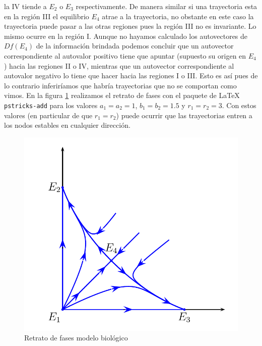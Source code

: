 la IV tiende a $E_2$ o $E_3$ respectivamente. De manera similar si
una trayectoria esta en la región III el equilibrio $E_4$ atrae a
la trayectoria, no obstante en este caso la trayectoria puede
pasar a las otras regiones pues la región III no es invariante. Lo
mismo ocurre en la región I. Aunque no hayamos calculado los
autovectores de $Df(E_4)$ de la información brindada podemos
concluir que un autovector correspondiente al autovalor positivo
tiene que apuntar (supuesto su origen en $E_4$) hacia las regiones
II o IV, mientras que un autovector correspondiente al autovalor
negativo lo tiene que hacer hacia las regiones I o III. Esto es
así pues de lo contrario inferiríamos que habría trayectorias que
no se comportan como vimos. En la figura \ref{modbio} realizamos
el retrato de fases con el paquete de \LaTeX\, \verb"pstricks-add"
para los valores $a_1=a_2=1$, $b_1=b_2=1.5$ y $r_1=r_2=3$. Con
estos valores (en particular de que $r_1=r_2$) puede ocurrir que
las trayectorias entren a los nodos estables en cualquier
dirección.

\begin{figure}[h]
\begin{center}
\includegraphics[scale=.4]{imagenes/EspCompIII.png}
\end{center}
\caption{Retrato de fases modelo biológico}\label{modbio}
\end{figure}

